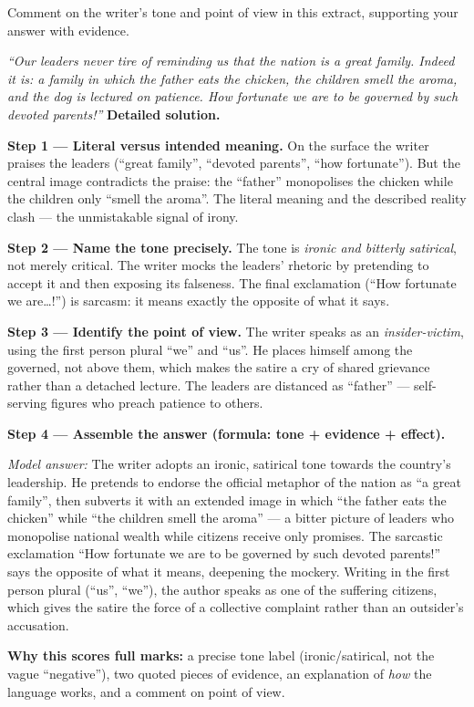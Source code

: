 \documentclass[11pt]{article}
\newcommand{\cle}[1]{{\popxbold\color{popdark}#1}}
\begin{document}
\begin{exoresolu}
Comment on the writer's tone and point of view in this extract, supporting your answer with evidence.

\emph{``Our leaders never tire of reminding us that the nation is a great family. Indeed it is: a family in which the father eats the chicken, the children smell the aroma, and the dog is lectured on patience. How fortunate we are to be governed by such devoted parents!''}
\tcblower
\textbf{Detailed solution.}

\textbf{Step 1 — Literal versus intended meaning.} On the surface the writer praises the leaders (``great family'', ``devoted parents'', ``how fortunate''). But the central image contradicts the praise: the ``father'' monopolises the chicken while the children only ``smell the aroma''. The literal meaning and the described reality clash — the unmistakable signal of \cle{irony}.

\textbf{Step 2 — Name the tone precisely.} The tone is \emph{ironic and bitterly satirical}, not merely critical. The writer mocks the leaders' rhetoric by pretending to accept it and then exposing its falseness. The final exclamation (``How fortunate we are\ldots!'') is sarcasm: it means exactly the opposite of what it says.

\textbf{Step 3 — Identify the point of view.} The writer speaks as an \emph{insider-victim}, using the first person plural ``we'' and ``us''. He places himself among the governed, not above them, which makes the satire a cry of shared grievance rather than a detached lecture. The leaders are distanced as ``father'' — self-serving figures who preach patience to others.

\textbf{Step 4 — Assemble the answer (formula: tone + evidence + effect).}

\emph{Model answer:} The writer adopts an ironic, satirical tone towards the country's leadership. He pretends to endorse the official metaphor of the nation as ``a great family'', then subverts it with an extended image in which ``the father eats the chicken'' while ``the children smell the aroma'' — a bitter picture of leaders who monopolise national wealth while citizens receive only promises. The sarcastic exclamation ``How fortunate we are to be governed by such devoted parents!'' says the opposite of what it means, deepening the mockery. Writing in the first person plural (``us'', ``we''), the author speaks as one of the suffering citizens, which gives the satire the force of a collective complaint rather than an outsider's accusation.

\textbf{Why this scores full marks:} a precise tone label (ironic/satirical, not the vague ``negative''), two quoted pieces of evidence, an explanation of \emph{how} the language works, and a comment on point of view.
\end{exoresolu}
\end{document}
